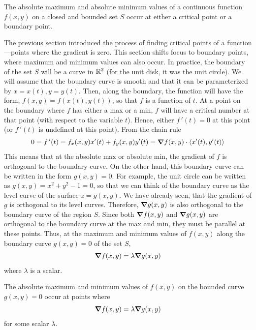 \documentclass[handout]{ximera}
\begin{document}
\begin{theorem}
The absolute maximum and absolute minimum values of a continuous function $f(x,y)$ on a closed and bounded set $S$ 
occur at either a critical point or a boundary point.
\end{theorem}

The previous section introduced the process of finding critical points of a function—points where the gradient is zero.
This section shifts focus to boundary points, where maximum and minimum values can also occur.
In practice, the boundary of the set $S$ will be a curve in $\mathbb R^2$ (for the unit disk, it was the unit circle).
We will assume that the boundary curve is smooth and that it can be parameterized by $x = x(t), y = y(t)$.
Then, along the boundary, the function will have the form, $f(x, y) = f(x(t), y(t))$, so that $f$ is a function of $t$.
At a point on the boundary where $f$ has either a max or a min, $f$ will have a critical number at that point (with respect to the variable $t$).
Hence, either $f\,'(t) = 0$ at this point (or $f\,'(t)$ is undefined at this point). From the chain rule
\[
0 = f\,'(t) = f_x(x, y) x'(t) + f_y(x,y) y'(t) = \boldsymbol\nabla f(x,y) \cdot \left\langle x'(t), y'(t)\right\rangle
\]
This means that at the absolute max or absolute min, the gradient of $f$ is orthogonal to the boundary curve.
On the other hand, this boundary curve can be written in the form $g(x,y) = 0$. For example, the unit circle can be written as $g(x,y) = x^2 + y^2 - 1 = 0$,
so that we can think of the boundary curve as the level curve of the surface $z = g(x,y)$. We have already seen, that the gradient of $g$ is orthogonal
to its level curves.  Therefore, $\boldsymbol\nabla g(x,y)$ is also orthogonal to the boundary curve of the region $S$.
Since both $\boldsymbol\nabla f(x,y)$ and $\boldsymbol\nabla g(x,y)$ are orthogonal to the boundary curve at the max and min, they must be parallel at these points.
Thus, at the maximum and minimum values of $f(x,y)$ along the boundary curve $g(x,y) = 0$ of the set $S$, 
\[
\boldsymbol\nabla f(x,y) = \lambda \boldsymbol\nabla g(x,y)
\]
where $\lambda$ is a scalar.

\begin{theorem}
The absolute maximum and minimum values of $f(x,y)$ on the bounded curve $g(x,y) = 0$ occur at 
points where 
\[
\boldsymbol\nabla f(x,y) = \lambda \boldsymbol\nabla g(x,y)
\]
for some scalar $\lambda$.
\end{theorem}
\end{document}
